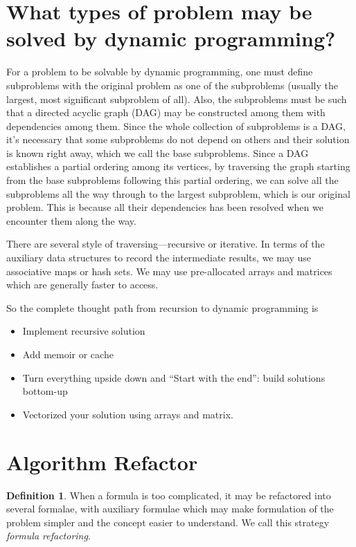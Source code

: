 \documentclass[oneside,11pt]{book}
\theoremstyle{definition}
\newtheorem{defn}{Definition}[section]
\theoremstyle{remark}
\begin{document}
\section{What types of problem may be solved by dynamic programming?}
\label{sec:types-of-problem-solved-by-dp}
For a problem to be solvable by dynamic programming, one must define
subproblems with the original problem as one of the subproblems (usually the largest, most
significant subproblem of all).
Also, the subproblems must be such that a directed acyclic graph (DAG) may be constructed among
them with dependencies among them.
Since the whole collection of subproblems is a DAG, it's necessary that some subproblems do not
depend on others and their solution is known right away, which we call the base subproblems.
Since a DAG establishes a partial ordering among its vertices, by traversing the graph starting
from the base subproblems following this partial ordering, we can solve all the subproblems  all
the way through to the largest subproblem, which is our original problem.
This is because all their dependencies has been resolved when we encounter them along the way.

There are several style of traversing---recursive or iterative.
In terms of the  auxiliary data structures to record the intermediate results, we may use
associative maps or hash sets.
We may use pre-allocated arrays and matrices which are generally faster to access.

So the complete thought path from recursion to dynamic programming is
\begin{itemize}
    \item Implement recursive solution
    \item Add memoir or cache
    \item Turn everything upside down and ``Start with the end'': build solutions bottom-up
    \item Vectorized your solution using arrays and matrix.
\end{itemize}

\section{Algorithm Refactor}\label{sec:algorithmRefactor}

\begin{defn}
    When a formula is too complicated, it may be refactored into several formalae, with auxiliary
    formulae which may make formulation of the problem simpler and the concept easier to understand.
    We call this strategy \emph{formula refactoring}.
\end{defn}
\end{document}
